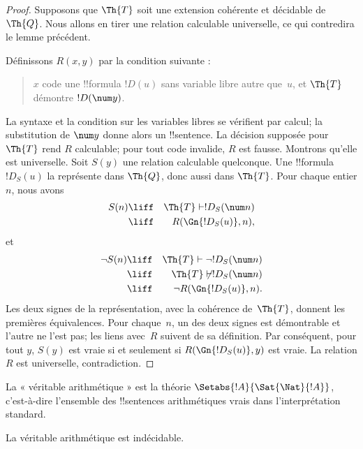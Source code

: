 \documentclass[../../../include/open-logic-section]{subfiles}
\begin{document}
\begin{proof}
Supposons que $\Th{T}$ soit une extension cohérente
et décidable de $\Th{Q}$. Nous allons en tirer une
relation calculable universelle, ce qui contredira
le lemme précédent.

Définissons $R(x,y)$ par la condition suivante :
\begin{quote}
$x$ code une !!{formula} $!D(u)$ sans variable libre autre que~$u$,
et $\Th{T}$ démontre $!D(\num y)$.
\end{quote}
La syntaxe et la condition sur les variables libres se vérifient
par calcul; la substitution de $\num y$ donne alors un !!{sentence}.
La décision supposée pour~$\Th{T}$ rend $R$ calculable; pour tout code invalide, $R$ est fausse. Montrons qu'elle
est universelle. Soit $S(y)$ une relation calculable
quelconque. Une !!{formula} $!D_S(u)$ la représente
dans $\Th{Q}$, donc aussi dans $\Th{T}$.
Pour chaque entier $n$, nous avons
\begin{eqnarray*}
S(n) & \liff & \Th{T}\vdash !D_S(\num n) \\
& \liff & R(\Gn{!D_S(u)},n),
\end{eqnarray*}
et
\begin{eqnarray*}
\lnot S(n) & \liff & \Th{T}\vdash\lnot !D_S(\num n) \\
& \liff & \Th{T}\not\vdash !D_S(\num n) \\
& \liff & \lnot R(\Gn{!D_S(u)},n).
\end{eqnarray*}
Les deux signes de la représentation, avec la cohérence
de~$\Th{T}$, donnent les premières équivalences.
Pour chaque~$n$, un des deux signes est démontrable
et l’autre ne l’est pas; les liens avec~$R$ suivent de sa définition.
Par conséquent,
pour tout $y$, $S(y)$ est vraie si et seulement si
$R(\Gn{!D_S(u)},y)$ est vraie. La relation $R$ est
universelle, contradiction.
\end{proof}

La « véritable arithmétique » est la théorie
$\Setabs{!A}{\Sat{\Nat}{!A}}$, c'est-à-dire
l'ensemble des !!{sentence}s arithmétiques vrais
dans l'interprétation standard.

\begin{cor}
La véritable arithmétique est indécidable.
\end{cor}

\end{document}
